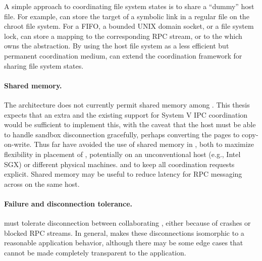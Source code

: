 
A simple approach to coordinating file system states is to share a ``dummy'' host file.
For example,  \thelibos{} can store the target of a symbolic link
in a regular file on the chroot file system.
For a FIFO, a bounded UNIX domain socket, or a file system lock,
\thelibos{} can store a mapping to the corresponding RPC stream, or to the \picoproc{} which owns the abstraction.
By using the host file system as a less efficient but permanent coordination medium,
\thelibos{} can extend the coordination framework for sharing file system states.



\paragraph{Shared memory.} The \graphene{} architecture 
does not currently permit shared memory among \picoprocs{}.
This thesis expects that an extra \hostapi{} and the existing support for System V IPC coordination would be sufficient to implement this,
with the caveat that the host must be able to handle sandbox disconnection gracefully, perhaps converting the pages to copy-on-write.
Thus far \graphene{} have avoided the use of shared memory in \thelibos{},
both to maximize flexibility in placement of \picoprocs{}, potentially on an unconventional host (e.g., Intel SGX) or different physical machines.
and to keep all coordination requests explicit.
Shared memory may be useful to reduce latency for RPC messaging across \picoprocs{} on the same host.



 


\paragraph{Failure and disconnection tolerance.}  
\thelibos{} must tolerate disconnection between collaborating \picoprocs{},
either because of crashes or blocked RPC streams.  In general, \thelibos{} makes 
these disconnections isomorphic to a reasonable application behavior,
although there may be some edge cases that cannot be made completely transparent to the application.

